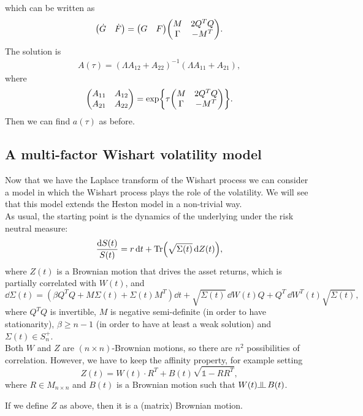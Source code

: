 which can be written as
\begin{equation*}
    \mqty(\dot{G} & \dot{F}) = \mqty(G & F)\mqty(M & 2Q^TQ \\ \Gamma & -M^T).
\end{equation*}
The solution is
\begin{align}
    A(\tau) = (\Lambda A_{12} + A_{22})^{-1}(\Lambda A_{11} + A_{21}),
\end{align}
where
\begin{equation}
    \mqty(A_{11} & A_{12} \\ A_{21} & A_{22}) = \exp{\tau\mqty(M & 2Q^TQ \\ \Gamma & -M^T)}.
\end{equation} %
Then we can find $a(\tau)$ as before.

\subsection{A multi-factor Wishart volatility model}
Now that we have the Laplace transform of the Wishart process we can consider a model in which the Wishart process plays the role of the volatility. We will see that this model extends the Heston model in a non-trivial way.\\
As usual, the starting point is the dynamics of the underlying under the risk neutral measure:
\begin{equation}
    \frac{\dd S(t)}{S(t)} = r\,\dd t + \Tr(\sqrt{\Sigma(t)} \,\dd Z(t)),
\end{equation}
where $Z(t)$ is a Brownian motion that drives the asset returns, which is partially correlated with $W(t)$, and
\begin{equation}
    \dd\Sigma(t) = (\beta Q^TQ + M\Sigma(t) + \Sigma(t)M^T)\dd t + \sqrt{\Sigma(t)}\,\dd W(t)Q + Q^T\,\dd W^T(t)\sqrt{\Sigma(t)},
\end{equation}
where $Q^TQ$ is invertible, $M$ is negative semi-definite (in order to have stationarity), $\beta\ge n-1$ (in order to have at least a weak solution) and $\Sigma(t)\in S^+_n$.\\
Both $W$ and $Z$ are $(n\times n)$-Brownian motions, so there are $n^2$ possibilities of correlation. However, we have to keep the affinity property, for example setting
\begin{equation}
    Z(t) = W(t)\cdot R^T + B(t)\sqrt{\mathds{1}-RR^T},
\end{equation}
where $R\in M_{n\times n}$ and $B(t)$ is a Brownian motion such that $W(t)\indep\, B(t)$.
\begin{proposition}
    If we define $Z$ as above, then it is a (matrix) Brownian motion.
\end{proposition}
